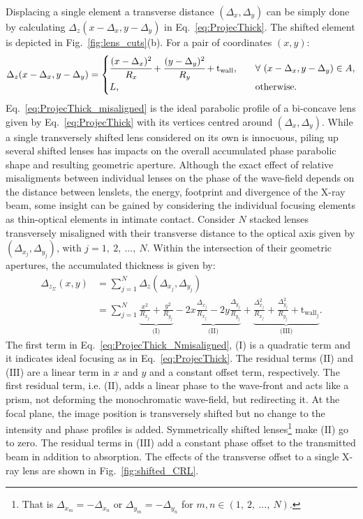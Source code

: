 \begin{refsection}
Displacing a single element a transverse distance $(\Delta_x,\Delta_y)$ can be simply done by calculating $\Delta_z(x-\Delta_x,y-\Delta_y)$ in Eq.~\ref{eq:ProjecThick}. The shifted element is depicted in Fig.~\ref{fig:lens_cuts}(b). For a pair of coordinates $(x,y)$:
\begin{equation}\label{eq:ProjecThick_misaligned}
    \Delta_z(x-\Delta_x,y-\Delta_y) = 
        \begin{cases}
      \cfrac{(x-\Delta_x)^2}{R_x}+\cfrac{(y-\Delta_y)^2}{R_y}+\text{t}_\text{wall}, &\quad\forall~(x-\Delta_x,y-\Delta_y) \in A,\\
      L, &\quad\text{otherwise}.
        \end{cases}
\end{equation}   
Eq.~\ref{eq:ProjecThick_misaligned} is the ideal parabolic profile of a bi-concave lens given by Eq.~\ref{eq:ProjecThick} with its vertices centred around $(\Delta_x,\Delta_y)$. While a single transversely shifted lens considered on its own is innocuous, piling up several shifted lenses has impacts on the overall accumulated phase parabolic shape and resulting geometric aperture. Although the exact effect of relative misaligments between individual lenses on the phase of the wave-field depends on the distance between lenslets, the energy, footprint and divergence of the X-ray beam, some insight can be gained by considering the individual focusing elements as thin-optical elements in intimate contact. Consider $N$ stacked lenses transversely misaligned with their transverse distance to the optical axis given by $(\Delta_{x_j},\Delta_{y_j})$, with $j=1,~2,~...,~N$. Within the intersection of their geometric apertures, the accumulated thickness is given by:
\begin{align}\label{eq:ProjecThick_Nmisaligned}
    \Delta_{z_\Sigma}(x,y) &= \sum\limits_{j=1}^N \Delta_z(\Delta_{x_j},\Delta_{y_j})\nonumber\\
    &=\sum\limits_{j=1}^N \underbrace{\frac{x^2}{R_{x_j}}+\frac{y^2}{R_{y_j}}}_\text{(I)}
    -\underbrace{2x\frac{\Delta_{x_j}}{R_{x_j}} - 2y\frac{\Delta_{y_j}}{R_{y_j}}}_\text{(II)}
    +\underbrace{\frac{\Delta_{x_j}^2}{R_{x_j}}+\frac{\Delta_{y_j}^2}{R_{y_j}}+\text{t}_{\text{wall}_j}}_\text{(III)}.
\end{align}
The first term in Eq.~\ref{eq:ProjecThick_Nmisaligned}, ($\text{I}$) is a quadratic term and it indicates ideal focusing as in Eq.~\ref{eq:ProjecThick}. The residual terms ($\text{II}$) and ($\text{III}$) are a linear term in $x$ and $y$ and a constant offset term, respectively. The first residual term, i.e. ($\text{II}$), adds a linear phase to the wave-front and acts like a prism, not deforming the monochromatic wave-field, but redirecting it. At the focal plane, the image position is transversely shifted but no change to the intensity and phase profiles is added. Symmetrically shifted lenses\footnote{That is $\Delta_{x_m}=-\Delta_{x_n}$ or $\Delta_{y_m}=-\Delta_{y_n}$ for $m,n\in(1,~2,~...,~N)$.} make ($\text{II}$) go to zero. The residual terms in ($\text{III}$) add a constant phase offset to the transmitted beam in addition to absorption. The effects of the transverse offset to a single X-ray lens are shown in Fig.~\ref{fig:shifted_CRL}.


\end{refsection}
